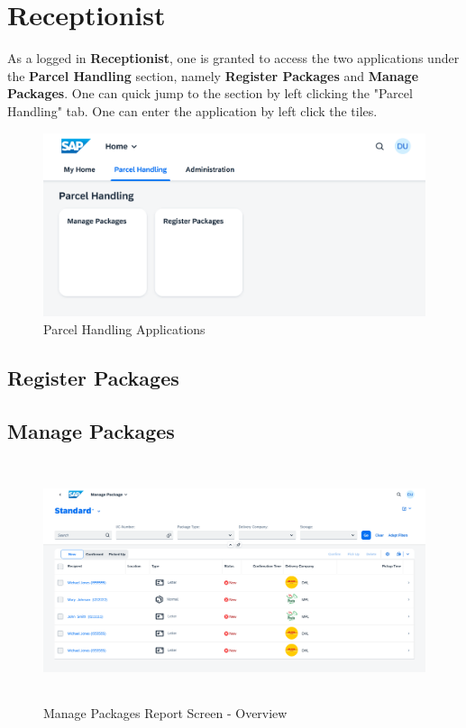 \pagebreak

\section{Receptionist}

As a logged in \textbf{Receptionist}, one is granted to access the two applications under the \textbf{Parcel Handling} section, namely \textbf{Register Packages} and \textbf{Manage Packages}. One can quick jump to the section by left clicking the "Parcel Handling" tab. One can enter the application by left click the tiles.

\begin{figure}[H]
	\centering
	\includegraphics[width=1\linewidth]{images/user_doc/overviews/ParcelHandlingTab.png}
	\caption{Parcel Handling Applications}
	\label{fig:PHApplications}
\end{figure}


\subsection{Register Packages}

\subsection{Manage Packages}                     

\begin{figure}[H]
	\centering
	\includegraphics[height=200pt]{images/user_doc/managePack/ReportScreen/browse/Overview.png}
	\caption{Manage Packages Report Screen - Overview}
	\label{fig:MPReportOverview}
\end{figure}

